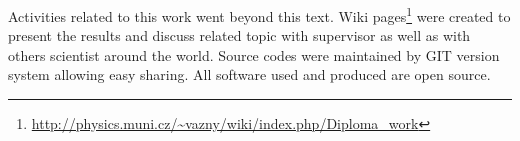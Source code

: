 Activities related to this work went beyond this text. Wiki
pages\footnote{\url{http://physics.muni.cz/~vazny/wiki/index.php/Diploma_work}}
were created to present the results and discuss related topic with
supervisor as well as with others scientist around the world. Source
codes were maintained by GIT version system allowing easy sharing. All
software used and produced are open source.








